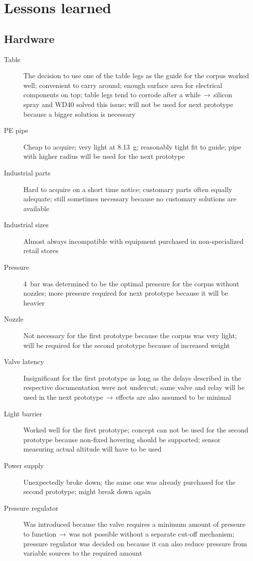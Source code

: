 \section{Lessons learned}
\subsection{Hardware}
\author{Sebastian Schaffler}

\begin{description}
\item [Table] The decision to use one of the table legs as the guide for the corpus worked well; convenient to carry around; enough surface area for electrical components on top; table legs tend to corrode after a while$\,\to\,$silicon spray and WD40 solved this issue; will not be used for next prototype because a bigger solution is necessary
\item [PE pipe] Cheap to acquire; very light at \SI{8,13}{\gram}; reasonably tight fit to guide; pipe with higher radius will be used for the next prototype
\item [Industrial parts] Hard to acquire on a short time notice; customary parts often equally adequate; still sometimes necessary because no customary solutions are available
\item [Industrial sizes] Almost always incompatible with equipment purchased in non-specialized retail stores
\item [Pressure] \SI{4}{\bar} was determined to be the optimal pressure for the corpus without nozzles; more pressure required for next prototype because it will be heavier
\item [Nozzle] Not necessary for the first prototype because the corpus was very light; will be required for the second prototype because of increased weight
\item [Valve latency] Insignificant for the first prototype as long as the delays described in the respective documentation were not undercut; same valve and relay will be used in the next prototype$\,\to\,$effects are also assumed to be minimal
\item [Light barrier] Worked well for the first prototype; concept can not be used for the second prototype because non-fixed hovering should be supported; sensor measuring actual altitude will have to be used
\item [Power supply] Unexpectedly broke down; the same one was already purchased for the second prototype; might break down again
\item [Pressure regulator] Was introduced because the valve requires a minimum amount of pressure to function$\,\to\,$was not possible without a separate cut-off mechanism; pressure regulator was decided on because it can also reduce pressure from variable sources to the required amount
\end{description}

